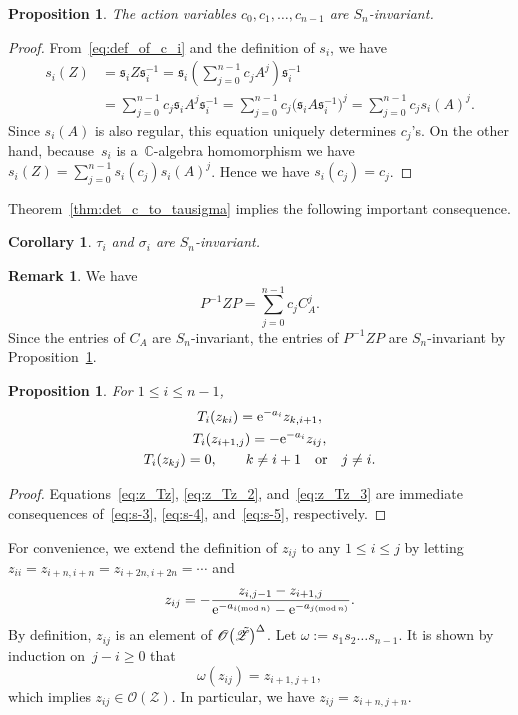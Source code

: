\documentclass[pdftex]{sigma}
\numberwithin{equation}{section}
\newcommand{\C}{\mathbb{C}}
\newcommand{\reg}{\Delta}
\newtheorem{Corollary}[Theorem]{Corollary}
\newtheorem{Proposition}[Theorem]{Proposition}
\theoremstyle{definition}
\newtheorem{Remark}[Theorem]{Remark}
\begin{document}
\begin{Proposition}\label{prop:S_n_invariant_functions}
The action variables $c_0,c_1,\dots,c_{n-1}$ are $S_n$-invariant.
\end{Proposition}
\begin{proof}
From~\eqref{eq:def_of_c_i} and the definition of $s_i$, we have
\begin{align*}
s_i(Z)&=\mathfrak{s}_iZ\mathfrak{s}_i^{-1}
=\mathfrak{s}_i\left(\sum_{j=0}^{n-1}c_jA^j\right)\mathfrak{s}_i^{-1}\\
&=\sum_{j=0}^{n-1}c_j\mathfrak{s}_iA^j\mathfrak{s}_i^{-1}=\sum_{j=0}^{n-1}c_j\bigl(\mathfrak{s}_iA\mathfrak{s}_i^{-1}\bigr)^j=\sum_{j=0}^{n-1}c_js_i(A)^j.
\end{align*}
Since $s_i(A)$ is also regular, this equation uniquely determines $c_j$'s.
On the other hand, because~$s_i$ is a~$\C$-algebra homomorphism we have
$s_i(Z)=\sum_{j=0}^{n-1}s_i(c_j)s_i(A)^j$.
Hence we have $s_i(c_j)=c_j$.
\end{proof}
Theorem~\ref{thm:det_c_to_tausigma} implies the following important consequence.
\begin{Corollary}\label{cor:tausigma invariant}
 $\tau_i$ and $\sigma_i$ are $S_n$-invariant.
\end{Corollary}
\begin{Remark}\label{rem:PinvZP}
We have
\[
P^{-1}ZP=\sum_{j=0}^{n-1}c_j C_A^j.
\]
Since the entries of $C_A$ are $S_n$-invariant,
the entries of $P^{-1}ZP$ are $S_n$-invariant by Proposition~\ref{prop:S_n_invariant_functions}.
\end{Remark}

\begin{Proposition}\label{prop:T_action_on_z}
For $1\le i\le n-1$,
\begin{gather}
T_i(z_{ki})={\rm e}^{-a_i}z_{k,i+1},\label{eq:z_Tz}\\
T_i(z_{i+1,j})=-{\rm e}^{-a_i}z_{ij},\label{eq:z_Tz_2}\\
T_i(z_{kj})=0,\qquad
k\ne i+1 \quad \text{or}\quad j\ne i.\label{eq:z_Tz_3}
\end{gather}
\end{Proposition}

\begin{proof}
Equations~\eqref{eq:z_Tz}, \eqref{eq:z_Tz_2}, and~\eqref{eq:z_Tz_3} are immediate consequences of~\eqref{eq:s-3}, \eqref{eq:s-4}, and~\eqref{eq:s-5}, respectively.
\end{proof}

For convenience, we extend the definition of $z_{ij}$ to any $1\le i\le j$ by letting $z_{ii}=z_{i+n,i+n}=z_{i+2n,i+2n}=\cdots$ and
\[%
z_{ij}=-
\frac{z_{i,j-1}-z_{i+1,j}}{{\rm e}^{-a_{i(\mathrm{mod}\, n)}}-{\rm e}^{-a_{j(\mathrm{mod}\, n)}}}.
\]
By definition, $z_{ij}$ is an element of $\mathscr{O}\bigl(\Tilde{\mathscr{Z}}\bigr)^{\reg}$.
Let $\omega:=s_1s_2\dots s_{n-1} $.
It is shown by induction on~${j-i\geq 0}$ that
\begin{equation}\label{eq:pi_zij}
\omega(z_{ij})=z_{i+1,j+1},
\end{equation}
which implies $z_{ij}\in \mathscr{O}(\mathscr{Z})$.
In particular, we have $z_{ij}=z_{i+n,j+n}$.
\end{document}
